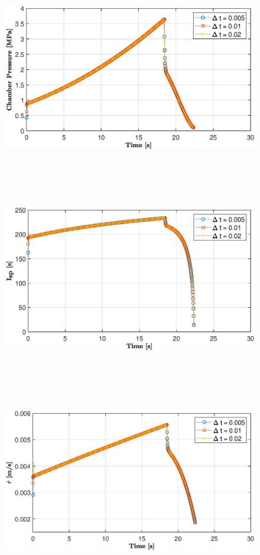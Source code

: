\documentclass[letterpaper,12pt]{article}
\begin{document}
\begin{figure}
	\centering
	\includegraphics[height = 8.5cm]{graphs/q1_pc.eps}
\end{figure}
\begin{figure}
	\centering
	\includegraphics[height = 8.5cm]{graphs/q1_isp.eps}
\end{figure}
\begin{figure}
	\centering
	\includegraphics[height = 8.5cm]{graphs/q1_rdot.eps}
\end{figure}
\end{document}
